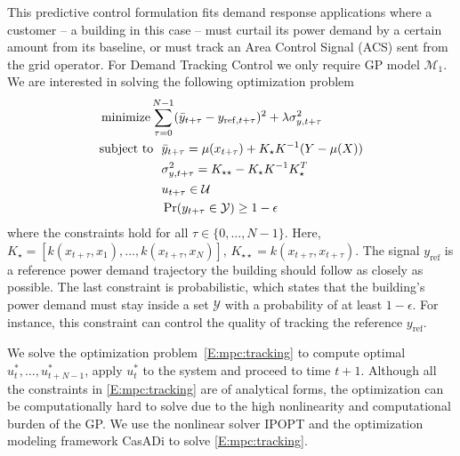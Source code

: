 This predictive control formulation fits demand response applications where a customer -- a building in this case -- must curtail its power demand by a certain amount from its baseline, or must track an Area Control Signal (ACS) sent from the grid operator.
For Demand Tracking Control we only require GP model \(\mathcal{M}_1\).
We are interested in solving the following optimization problem
\begin{align}
  &\operatorname*{minimize} \sum_{\tau=0}^{N-1} (\bar{y}_{t+\tau} - y_{\mathrm{ref},t+\tau})^2 + \lambda \sigma^2_{y,t+\tau} \label{E:mpc:tracking} \\
  & 
    \begin{aligned}
      \text{subject to}\ \  & \bar{y}_{t+\tau} = \mu(x_{t+\tau}) + K_\star K^{-1} (Y - \mu(X)) \nonumber\\
      & \sigma^2_{y,t+\tau} = K_{\star \star} - K_\star K^{-1} K_\star^T \\
      & u_{t+\tau} \in \mathcal{U} \nonumber \\
      & \Pr(y_{t+\tau} \in \mathcal{Y}) \geq 1 - \epsilon \nonumber
    \end{aligned}
\end{align}
where the constraints hold for all \(\tau \in \{0,\dots,N-1\}\).
Here, \(K_\star = [k(x_{t+\tau}, x_1), \dots, k(x_{t+\tau}, x_N)]\), \(K_{\star \star} = k(x_{t+\tau}, x_{t+\tau})\). %
The signal $y_{\mathrm{ref}}$ is a reference power demand trajectory the building should follow as closely as possible.
The last constraint is probabilistic, which states that the building's power demand must stay inside a set $\mathcal{Y}$ with a probability of at least $1 - \epsilon$.
For instance, this constraint can control the quality of tracking the reference $y_{\mathrm{ref}}$.

We solve the optimization problem~\eqref{E:mpc:tracking} to compute optimal \(u_{t}^*, \dots, u_{t+N-1}^*\), apply \(u_{t}^*\) to the system and proceed to time \(t+1\).
Although all the constraints in \eqref{E:mpc:tracking} are of analytical forms, the optimization can be computationally hard to solve due to the high nonlinearity and computational burden of the GP.
We use the nonlinear solver IPOPT \cite{Waechter2009b} and the optimization modeling framework CasADi \cite{Andersson2013b} to solve \eqref{E:mpc:tracking}.

